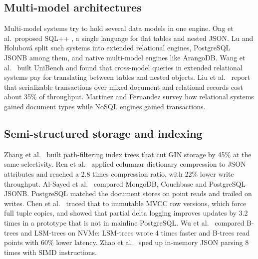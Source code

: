 \documentclass[conference,a4paper]{IEEEtran}
\begin{document}
\subsection{Multi-model architectures}
Multi-model systems try to hold several data models in one engine. Ong et al.\ proposed SQL++ \cite{ong2014}, a single language for flat tables and nested JSON. Lu and Holubov\'a \cite{lu2019} split such systems into extended relational engines, PostgreSQL JSONB among them, and native multi-model engines like ArangoDB. Wang et al.\ \cite{wang2021} built UniBench and found that cross-model queries in extended relational systems pay for translating between tables and nested objects. Liu et al.\ \cite{liu2022} report that serializable transactions over mixed document and relational records cost about 35\% of throughput. Martinez and Fernandez \cite{martinez2026} survey how relational systems gained document types while NoSQL engines gained transactions.

\subsection{Semi-structured storage and indexing}
Zhang et al.\ \cite{zhang2021} built path-filtering index trees that cut GIN storage by 45\% at the same selectivity. Ren et al.\ \cite{ren2022} applied columnar dictionary compression to JSON attributes and reached a 2.8 times compression ratio, with 22\% lower write throughput. Al-Sayed et al.\ \cite{alsayed2023} compared MongoDB, Couchbase and PostgreSQL JSONB. PostgreSQL matched the document stores on point reads and trailed on writes. Chen et al.\ \cite{chen2024} traced that to immutable MVCC row versions, which force full tuple copies, and showed that partial delta logging improves updates by 3.2 times in a prototype that is not in mainline PostgreSQL. Wu et al.\ \cite{wu2024} compared B-trees and LSM-trees on NVMe: LSM-trees wrote 4 times faster and B-trees read points with 60\% lower latency. Zhao et al.\ \cite{zhao2025} sped up in-memory JSON parsing 8 times with SIMD instructions.
\end{document}
